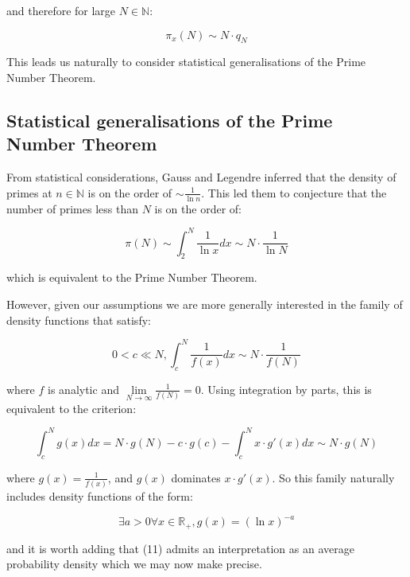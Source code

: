 \documentclass{article}
\begin{document}
and therefore for large $N \in \mathbb{N}$:

\begin{equation}
\pi_x(N) \sim N \cdot q_N 	
\end{equation} 

This leads us naturally to consider statistical generalisations of the Prime Number Theorem. 

\subsection{Statistical generalisations of the Prime Number Theorem}

From statistical considerations, Gauss and Legendre inferred that the density of primes at $n \in \mathbb{N}$ is on the order of $\sim \frac{1}{\ln n}$. This led them to conjecture that the number of primes less than $N$ is on the order of:

\begin{equation}
\pi(N) \sim \int_{2}^N \frac{1}{\ln x} dx \sim N \cdot \frac{1}{\ln N}
\end{equation}

which is equivalent to the Prime Number Theorem.

However, given our assumptions we are more generally interested in the family of density functions that satisfy:  

\begin{equation}
0 < c \ll N, \int_{c}^N \frac{1}{f(x)} dx \sim N \cdot \frac{1}{f(N)}
\end{equation}

where $f$ is analytic and $\lim\limits_{N \to \infty} \frac{1}{f(N)}=0$. Using integration by parts, this is equivalent to the criterion:

\begin{equation}
\int_{c}^N g(x) dx = N \cdot g(N) - c \cdot g(c) - \int_{c}^N x \cdot g'(x) dx \sim N \cdot g(N)
\end{equation}

where $g(x)=\frac{1}{f(x)}$, and $g(x)$ dominates $x \cdot g'(x)$.
So this family naturally includes density functions of the form:

\begin{equation}
\exists a > 0 \forall x \in \mathbb{R}_+, g(x) = (\ln x)^{-a}
\end{equation}

and it is worth adding that (11) admits an interpretation as 
an average probability density which we may now make precise.
\newpage  
\end{document}
